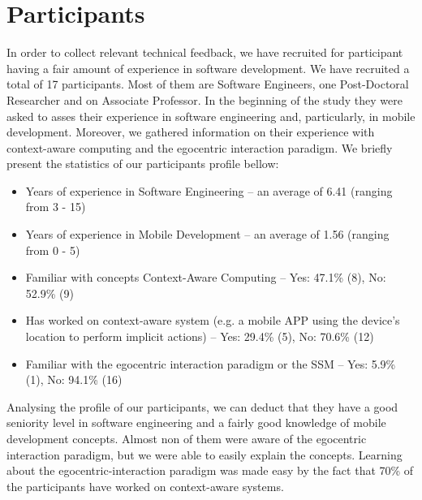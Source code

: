 \section{Participants} %
\label{sec:eval_participants}
In order to collect relevant technical feedback, we have recruited for participant having a fair amount of experience in software development. We have recruited a total of 17 participants. Most of them are Software Engineers, one Post-Doctoral Researcher and on Associate Professor. In the beginning of the study they were asked to asses their experience in software engineering and, particularly, in mobile development. Moreover, we gathered information on their experience with context-aware computing and the egocentric interaction paradigm. We briefly present the statistics of our participants profile bellow:
\begin{itemize}
	\item Years of experience in Software Engineering -- an average of 6.41 (ranging from 3 - 15)
	\item Years of experience in Mobile Development -- an average of 1.56 (ranging from 0 - 5)
	\item Familiar with concepts Context-Aware Computing -- Yes: 47.1\% (8), No: 52.9\% (9)
	\item Has worked on context-aware system (e.g. a mobile APP using the device's location to perform implicit actions) -- Yes: 29.4\% (5), No: 70.6\% (12)
	\item Familiar with the egocentric interaction paradigm or the SSM -- Yes: 5.9\% (1), No: 94.1\% (16)
\end{itemize}

Analysing the profile of our participants, we can deduct that they have a good seniority level in software engineering and a fairly good knowledge of mobile development concepts. Almost non of them were aware of the egocentric interaction paradigm, but we were able to easily explain the concepts. Learning about the egocentric-interaction paradigm was made easy by the fact that 70\% of the participants have worked on context-aware systems.
